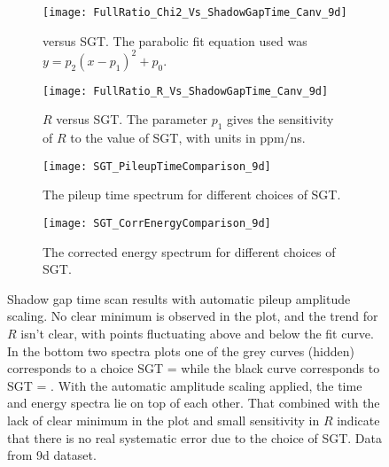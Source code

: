 \begin{figure}[]
\centering
    \begin{subfigure}[t]{0.45\textwidth}
        \centering
        \texttt{[image: FullRatio\_Chi2\_Vs\_ShadowGapTime\_Canv\_9d]}
        \caption{\chisq versus SGT. The parabolic fit equation used was $y = p_{2}(x - p_{1})^{2} + p_{0}.$}
    \end{subfigure}%
    \hspace{1cm}
    \begin{subfigure}[t]{0.45\textwidth}
        \centering
        \texttt{[image: FullRatio\_R\_Vs\_ShadowGapTime\_Canv\_9d]}
        \caption{$R$ versus SGT. The parameter $p_{1}$ gives the sensitivity of $R$ to the value of SGT, with units in ppm/ns.}
    \end{subfigure}

    \begin{subfigure}[t]{0.45\textwidth}
        \centering
        \texttt{[image: SGT\_PileupTimeComparison\_9d]}
        \caption{The pileup time spectrum for different choices of SGT.}
    \end{subfigure}%
    \hspace{1cm}
    \begin{subfigure}[t]{0.45\textwidth}
        \centering
        \texttt{[image: SGT\_CorrEnergyComparison\_9d]}
        \caption{The corrected energy spectrum for different choices of SGT.}
    \end{subfigure}
\caption[Pileup shadow gap time scan with automatic pileup amplitude scaling]{Shadow gap time scan results with automatic pileup amplitude scaling. No clear minimum is observed in the \chisq plot, and the trend for $R$ isn't clear, with points fluctuating above and below the fit curve. In the bottom two spectra plots one of the grey curves (hidden) corresponds to a choice SGT =  while the black curve corresponds to SGT = . With the automatic amplitude scaling applied, the time and energy spectra lie on top of each other. That combined with the lack of clear minimum in the \chisq plot and small sensitivity in $R$ indicate that there is no real systematic error due to the choice of SGT. Data from 9d dataset.}
\label{fig:SGTscan}
\end{figure}



